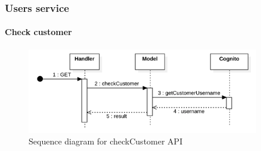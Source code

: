 \subsubsection{Users service}
\paragraph*{Check customer}
\begin{figure}[H]
    \includegraphics[width=0.9\textwidth]{res/images/sequence-diagrams/users/checkCustomer.png}
    \caption{Sequence diagram for checkCustomer API}
\end{figure}
